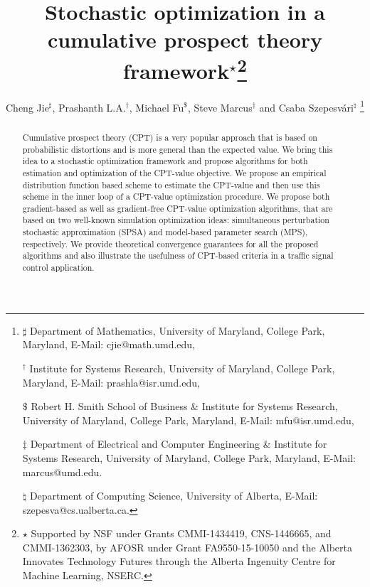 \documentclass[twocolumn]{IEEEtran}
\begin{document}
\title{Stochastic optimization in a cumulative prospect theory framework$^\star$\thanks{$\star$ Supported by NSF under Grants CMMI-1434419, CNS-1446665, and
CMMI-1362303, by AFOSR under Grant FA9550-15-10050 and the Alberta Innovates Technology Futures through the Alberta Ingenuity Centre for Machine Learning, NSERC.}}
\author{Cheng Jie$^\sharp$, Prashanth L.A.$^\dagger$, Michael Fu$^\$$, Steve Marcus$^\ddag$ and Csaba Szepesv\'ari$^\natural$
\thanks{
$\sharp$ Department of Mathematics,
University of Maryland, College Park, Maryland, 
E-Mail: cjie@math.umd.edu, 

$^\dagger$ Institute for Systems Research, University of Maryland, College Park, Maryland,
E-Mail: prashla@isr.umd.edu,

$\$$ Robert H. Smith School of Business \& Institute for Systems Research,
University of Maryland, College Park, Maryland,
E-Mail: mfu@isr.umd.edu,

$\ddag$ Department of Electrical and Computer Engineering \& Institute for Systems Research,
University of Maryland, College Park, Maryland,
 E-Mail: marcus@umd.edu.

$\natural$ Department of Computing Science,
University of Alberta,
 E-Mail: szepesva@cs.ualberta.ca.
}}
\maketitle


\begin{abstract}
Cumulative prospect theory (CPT) is a very popular approach that is based on probabilistic distortions and is more general than the expected value.  We bring this idea to a stochastic optimization framework and propose algorithms for both estimation and optimization of the CPT-value objective. We propose an empirical distribution function based scheme to estimate the CPT-value and then use this scheme in the inner loop of a CPT-value optimization procedure. We propose both gradient-based as well as gradient-free CPT-value optimization algorithms, that are based on two well-known simulation optimization ideas: simultaneous perturbation stochastic approximation (SPSA) and model-based parameter search (MPS), respectively.  We provide theoretical convergence guarantees for all the proposed algorithms 
and also illustrate the usefulness of CPT-based criteria in a traffic signal control application.
\end{abstract}
\end{document}
